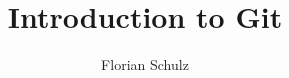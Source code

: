 \documentclass{beamer}
\title[Git]{Introduction to Git}
\author{Florian Schulz}
\begin{document}
\begin{frame}
\titlepage
\end{frame}



\end{document}
